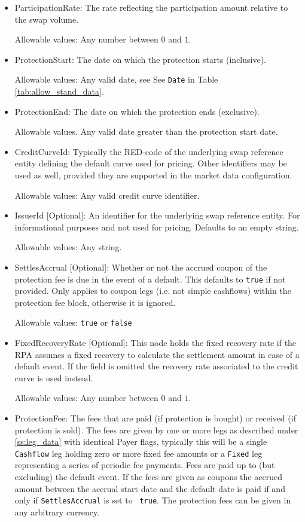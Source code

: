 \begin{itemize}
\item ParticipationRate: The rate reflecting the participation amount relative to the swap volume.

Allowable values: Any number between $0$ and $1$.

\item ProtectionStart: The date on which the protection starts (inclusive).

Allowable values: Any valid date, see See \lstinline!Date! in Table \ref{tab:allow_stand_data}.

\item ProtectionEnd: The date on which the protection ends (exclusive).

Allowable values. Any valid date greater than the protection start date.

\item CreditCurveId: Typically the RED-code of the underlying swap reference entity defining the default curve used for
  pricing. Other identifiers may be used as well, provided they are supported in the market data configuration.

Allowable values: Any valid credit curve identifier.

\item IssuerId [Optional]: An identifier for the underlying swap reference entity. For informational purposes and not
  used for pricing. Defaults to an empty string.

Allowable values: Any string.

\item SettlesAccrual [Optional]: Whether or not the accrued coupon of the protection fee is due in the event of a
  default. This defaults to \lstinline!true! if not provided. Only applies to coupon legs (i.e. not simple cashflows)
  within the protection fee block, otherwise it is ignored.

Allowable values: {\tt true} or {\tt false}

\item FixedRecoveryRate [Optional]: This node holds the fixed recovery rate if the RPA assumes a fixed recovery to
  calculate the settlement amount in case of a default event. If the field is omitted the recovery rate associated to
  the credit curve is used instead.

Allowable values: Any number between $0$ and $1$.

\item ProtectionFee: The fees that are paid (if protection is bought) or received (if protection is sold). The fees are
  given by one or more legs as described under \ref{ss:leg_data} with identical Payer flags, typically this will be a
  single {\tt Cashflow} leg holding zero or more fixed fee amounts or a {\tt Fixed} leg representing a series of periodic
  fee payments. Fees are paid up to (but excluding) the default event. If the fees are given as coupons the accrued
  amount between the accrual start date and the default date is paid if and only if {\tt SettlesAccrual} is set to {\tt
    true}. The protection fees can be given in any arbitrary currency.


\end{itemize}
